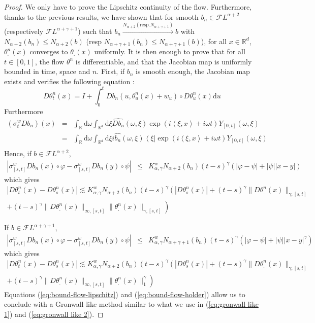 \documentclass[11pt,a4paper,draft,reqno]{amsart}
\theoremstyle{definition}
\newcommand{\RR}{\mathbb{R}}
\newcommand{\cF}{\mathcal{F}}
\newcommand{\dd}{\mathrm{d}}
\newcommand{\la}{\left\langle}
\newcommand{\ra}{\right\rangle}
\begin{document}
\begin{proof}
We only have to prove the Lipschitz continuity of the flow. Furthermore, thanks to the previous results, we have shown that for smooth $b_n\in\cF L^{\alpha+2}$ (respectively $\cF L^{\alpha+\gamma+1}$) such that $b_n\overset{N_{\alpha+2} (\mathrm{resp.} N_{\alpha+\gamma+1}) }{\longrightarrow} b$ with $N_{\alpha+2}(b_n)\le N_{\alpha+2}(b)$ (resp $N_{\alpha+\gamma+1}(b_n)\le N_{\alpha+\gamma+1}(b)$), for all $x\in\RR^d$, $\theta^n_.(x)$ converges to $\theta_.(x)$ uniformly. It is then enough to prove that for all $t\in[0,1]$, the flow $\theta^n$ is differentiable, and that the Jacobian map is uniformly bounded in time, space and $n$. First, if $b_n$ is smooth enough, the Jacobian map exists and verifies the following equation : 
$$D\theta^n_t(x) = I + \int_{0}^t Db_n(u,\theta^n_u(x)+w_u)\circ D\theta^n_u(x)\dd u $$ 
Furthermore
\begin{eqnarray*}
\left(\sigma^w_tDb_n\right)(x) 
&=&
\int_\RR \dd \omega\int_{\RR^d}\dd \xi \hat{Db_n}(\omega,\xi)\exp(i\la\xi,x\ra+i\omega t)Y_{[0,t]}(\omega,\xi)\\
&=&
\int_\RR \dd \omega\int_{\RR^d}\dd \xi i\hat{b_n}(\omega,\xi)\la\xi\right|\exp(i\la\xi,x\ra+i\omega t)Y_{[0,t]}(\omega,\xi)\\
\end{eqnarray*}
Hence, if $b\in\cF L^{\alpha+2}$, 
\begin{eqnarray*}
|\sigma^w_{[s,t]}Db_n(x)\circ\varphi-\sigma^w_{[s,t]}Db_n(y)\circ\psi|
&\le&
K_{\alpha,\gamma}^w N_{\alpha+2}(b_n)(t-s)^{\gamma}\left(|\varphi-\psi|+|\psi||x-y|\right)
\end{eqnarray*}
which gives
\begin{multline}\label{eq:bound-flow-lipschitz}
|D\theta^n_t(x)-D\theta^n_s(x)|
\lesssim
K_{\alpha,\gamma}^wN_{\alpha+2}(b_n)(t-s)^\gamma\left(|D\theta^n_s(x)|\right.
+(t-s)^\gamma\|D\theta^n_.(x)\|_{\gamma,[s,t]}\\
\left.+(t-s)^\gamma\|D\theta^n_.(x)\|_{\infty,[s,t]}\|\theta^n_.(x)\|_{\gamma,[s,t]}\right)
\end{multline}

If $b\in\cF L^{\alpha+\gamma+1}$,
\begin{eqnarray*}
|\sigma^w_{[s,t]}Db_n(x)\circ\varphi-\sigma^w_{[s,t]}Db_n(y)\circ\psi|
&\le&
K_{\alpha,\gamma}^w N_{\alpha+\gamma+1}(b_n)(t-s)^{\gamma}\left(|\varphi-\psi|+|\psi||x-y|^\gamma\right)
\end{eqnarray*}
which gives
\begin{multline}\label{eq:bound-flow-holder}
|D\theta^n_t(x)-D\theta^n_s(x)|
\lesssim
K_{\alpha,\gamma}^wN_{\alpha+2}(b_n)(t-s)^\gamma\left(|D\theta^n_s(x)|\right.
+(t-s)^\gamma\|D\theta^n_.(x)\|_{\gamma,[s,t]}\\
\left.+(t-s)^\gamma\|D\theta^n_.(x)\|_{\infty,[s,t]}\|\theta^n_.(x)\|_{1}^\gamma \right)
\end{multline}
Equations (\ref{eq:bound-flow-lipschitz}) and (\ref{eq:bound-flow-holder}) allow us to conclude with a Gronwall like method similar to what we use in (\ref{eq:gronwall like 1}) and (\ref{eq:gronwall like 2}).
\end{proof}
\end{document}
